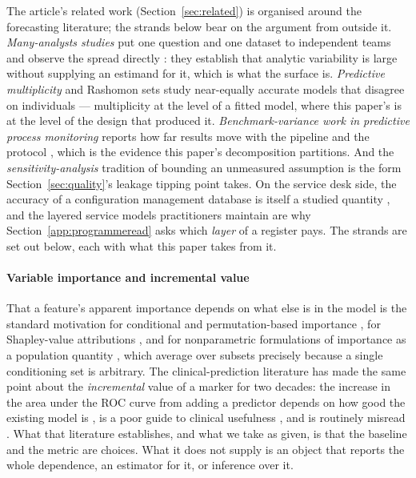The article's related work (Section~\ref{sec:related}) is organised around
the forecasting literature; the strands below bear on the argument from
outside it. \emph{Many-analysts studies} put
one question and one dataset to independent teams and observe the spread
directly \citep{silberzahn2018many,breznau2022observing}: they establish that
analytic variability is large without supplying an estimand for it, which is
what the surface is. \emph{Predictive multiplicity} and Rashomon sets study
near-equally accurate models that disagree on individuals
\citep{marx2020predictive,semenova2022existence} --- multiplicity at the level
of a fitted model, where this paper's is at the level of the design that
produced it. \emph{Benchmark-variance work in predictive process monitoring}
reports how far results move with the pipeline and the protocol
\citep{ramamaneiro2021deep}, which is the evidence this paper's decomposition
partitions. And the \emph{sensitivity-analysis} tradition of bounding an
unmeasured assumption \citep{vanderweele2017sensitivity} is the form
Section~\ref{sec:quality}'s leakage tipping point takes. On the service desk side,
the accuracy of a configuration management database is itself a studied
quantity \citep{suriadi2017imperfection,mohammed2025dataquality}, and the
layered service models practitioners maintain are why
Section~\ref{app:programmeread} asks which \emph{layer} of a register pays.
The strands are set out below, each with what this paper takes
from it.



\paragraph{Variable importance and incremental value}
That a feature's apparent importance depends on what else is in the model is
the standard motivation for conditional and permutation-based importance
\citep{strobl2008conditional,fisher2019models}, for Shapley-value attributions
\citep{lundberg2017unified,covert2020sage}, and for nonparametric formulations
of importance as a population quantity \citep{williamson2021vimp}, which
average over subsets precisely because a single conditioning set is arbitrary.
The clinical-prediction literature has made the same point about the
\emph{incremental} value of a marker for two decades: the increase in the area
under the ROC curve from adding a predictor depends on how good the existing
model is \citep{pencina2008evaluating,cook2007roc}, is a poor guide to
clinical usefulness \citep{cook2007roc,vickers2008decision}, and is routinely
misread \citep{kerr2011evaluating}. What that literature establishes, and what
we take as given, is that the baseline and the metric are choices. What it
does not supply is an object that reports the whole dependence, an estimator
for it, or inference over it.


